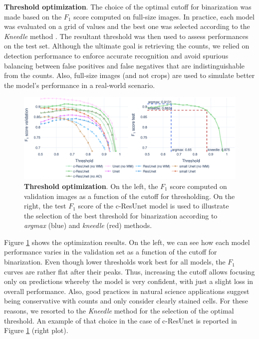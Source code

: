 \noindent\textbf{Threshold optimization}.
The choice of the optimal cutoff for binarization was made based on the $F_1$ score computed on full-size images. In practice, each model was evaluated on a grid of values and the best one was selected according to the \textit{Kneedle} method \cite{kneedle}. The resultant threshold was then used to assess performances on the test set.
Although the ultimate goal is retrieving the counts, we relied on detection performance to enforce accurate recognition and avoid spurious balancing between false positives and false negatives that are indistinguishable from the counts.
Also, full-size images (and not crops) are used to simulate better the model's performance in a real-world scenario.
\begin{figure}
\centerline{
\includegraphics[width=0.8\linewidth]{figures/130_methods/F1_optimization.eps}
}
\caption{\textbf{Threshold optimization}. On the left, the $F_{1}$ score computed on validation images as a function of the cutoff for thresholding.
On the right, the test $F_1$ score of the c-ResUnet model is used to illustrate the selection of the best threshold for binarization according to \textit{argmax} (blue) and \textit{kneedle} (red) methods.
} 
\label{fig:thresh_opt}
\end{figure}

Figure \ref{fig:thresh_opt} shows the optimization results. On the left, we can see how each model performance varies in the validation set as a function of the cutoff for binarization.
Even though lower thresholds work best for all models, the $F_1$ curves are rather flat after their peaks. Thus, increasing the cutoff allows focusing only on predictions whereby the model is very confident, with just a slight loss in overall performance.
Also, good practices in natural science applications suggest being conservative with counts and only consider clearly stained cells.
For these reasons, we resorted to the \textit{Kneedle} method \cite{kneedle} for the selection of the optimal threshold. An example of that choice in the case of c-ResUnet is reported in Figure \ref{fig:thresh_opt} (right plot).